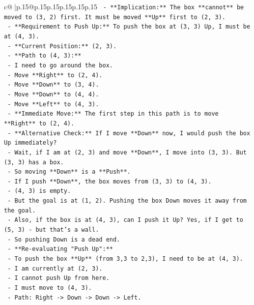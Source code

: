 \documentclass{article}
\begin{document}
{\begin{supertabular}{c@{$\;$}|p{.15\linewidth}@{}p{.15\linewidth}p{.15\linewidth}p{.15\linewidth}p{.15\linewidth}p{.15\linewidth}}
{{{\texttt{    {-} **Implication:** The box **cannot** be moved to (3, 2) first. It must be moved **Up** first to (2, 3).} \\
\texttt{    {-} **Requirement to Push Up:** To push the box at (3, 3) Up, I must be at (4, 3).} \\
\texttt{    {-} **Current Position:** (2, 3).} \\
\texttt{    {-} **Path to (4, 3):**} \\
\texttt{        {-} I need to go around the box.} \\
\texttt{        {-} Move **Right** to (2, 4).} \\
\texttt{        {-} Move **Down** to (3, 4).} \\
\texttt{        {-} Move **Down** to (4, 4).} \\
\texttt{        {-} Move **Left** to (4, 3).} \\
\texttt{    {-} **Immediate Move:** The first step in this path is to move **Right** to (2, 4).} \\
\texttt{    {-} **Alternative Check:** If I move **Down** now, I would push the box Up immediately?} \\
\texttt{        {-} Wait, if I am at (2, 3) and move **Down**, I move into (3, 3). But (3, 3) has a box.} \\
\texttt{        {-} So moving **Down** is a **Push**.} \\
\texttt{        {-} If I push **Down**, the box moves from (3, 3) to (4, 3).} \\
\texttt{        {-} (4, 3) is empty.} \\
\texttt{        {-} But the goal is at (1, 2). Pushing the box Down moves it away from the goal.} \\
\texttt{        {-} Also, if the box is at (4, 3), can I push it Up? Yes, if I get to (5, 3) {-} but that's a wall.} \\
\texttt{        {-} So pushing Down is a dead end.} \\
\texttt{    {-} **Re{-}evaluating "Push Up":**} \\
\texttt{        {-} To push the box **Up** (from 3,3 to 2,3), I need to be at (4, 3).} \\
\texttt{        {-} I am currently at (2, 3).} \\
\texttt{        {-} I cannot push Up from here.} \\
\texttt{        {-} I must move to (4, 3).} \\
\texttt{        {-} Path: Right {-}> Down {-}> Down {-}> Left.} \\
}}}
\end{supertabular}}
\end{document}
